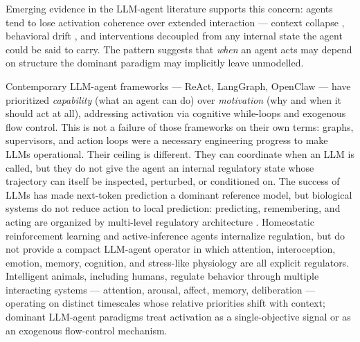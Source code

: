 \documentclass{article}
\begin{document}
Emerging evidence in the LLM-agent literature supports this concern: agents tend to lose activation coherence over extended interaction --- context collapse \citep{liu2024lost}, behavioral drift \citep{rath2026agentdrift}, and interventions decoupled from any internal state the agent could be said to carry. The pattern suggests that \textit{when} an agent acts may depend on structure the dominant paradigm may implicitly leave unmodelled.

Contemporary LLM-agent frameworks --- ReAct, LangGraph, OpenClaw --- have prioritized \textit{capability} (what an agent can do) over \textit{motivation} (why and when it should act at all), addressing activation via cognitive while-loops and exogenous flow control. This is not a failure of those frameworks on their own terms: graphs, supervisors, and action loops were a necessary engineering progress to make LLMs operational. Their ceiling is different. They can coordinate when an LLM is called, but they do not give the agent an internal regulatory state whose trajectory can itself be inspected, perturbed, or conditioned on. The success of LLMs has made next-token prediction a dominant reference model, but biological systems do not reduce action to local prediction: predicting, remembering, and acting are organized by multi-level regulatory architecture \citep{zou2026constituent}. Homeostatic reinforcement learning \citep{keramati2014homeostatic} and active-inference agents \citep{friston2017active,tschantz2020scaling} internalize regulation, but do not provide a compact LLM-agent operator in which attention, interoception, emotion, memory, cognition, and stress-like physiology are all explicit regulators. Intelligent animals, including humans, regulate behavior through multiple interacting systems --- attention, arousal, affect, memory, deliberation --- operating on distinct timescales whose relative priorities shift with context; dominant LLM-agent paradigms treat activation as a single-objective signal or as an exogenous flow-control mechanism.
\end{document}
